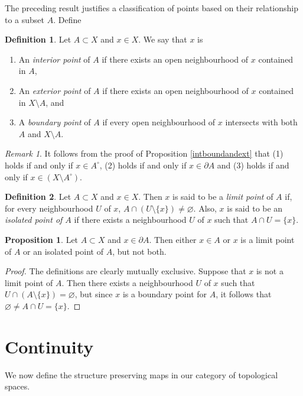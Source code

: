 \documentclass{book}
\theoremstyle{definition}
\newtheorem{proposition}{Proposition}[section]
\newtheorem{definition}{Definition}[section]
\theoremstyle{remark}
\newtheorem{remark}{Remark}[section]
\begin{document}
The preceding result justifies a classification of points based on their relationship to a subset $A$. Define

\begin{definition}
Let $A\subset X$ and $x\in X$. We say that $x$ is
\begin{enumerate}
    \item An \textit{interior point} of $A$ if there exists an open neighbourhood of $x$ contained in $A$,
    \item An \textit{exterior point} of $A$ if there exists an open neighbourhood of $x$ contained in $X\setminus A$, and
    \item A \textit{boundary point} of $A$ if every open neighbourhood of $x$ intersects with both $A$ and $X\setminus A$.
\end{enumerate}
\end{definition}

\begin{remark}
It follows from the proof of Proposition \ref{intboundandext} that (1) holds if and only if $x\in A^\circ$, (2) holds if and only if $x\in\partial A$ and (3) holds if and only if $x\in (X\setminus A^\circ)$.
\end{remark}

\begin{definition}
Let $A\subset X$ and $x\in X$. Then $x$ is said to be a \textit{limit point} of $A$ if, for every neighbourhood $U$ of $x$, $A\cap (U\setminus\{x\})\neq\varnothing$. Also, $x$ is said to be an \textit{isolated point of $A$} if there exists a neighbourhood $U$ of $x$ such that $A\cap U=\{x\}$.
\end{definition}

\begin{proposition}
Let $A\subset X$ and $x\in \partial A$. Then either $x\in A$ or $x$ is a limit point of $A$ or an isolated point of $A$, but not both.
\end{proposition}
\begin{proof}
The definitions are clearly mutually exclusive. Suppose that $x$ is not a limit point of $A$. Then there exists a neighbourhood $U$ of $x$ such that $U\cap (A\setminus\{x\})=\varnothing$, but since $x$ is a boundary point for $A$, it follows that $\varnothing\neq A\cap U=\{x\}$.
\end{proof}

\section{Continuity}
We now define the structure preserving maps in our category of topological spaces.
\end{document}
